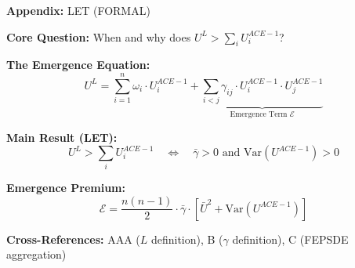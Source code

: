 
\begin{tcolorbox}[colback=blue!5!white, colframe=blue!75!black,
    title=Quick Reference: Level Emergence Theorem]
\textbf{Appendix:} LET (FORMAL)


\textbf{Core Question:} When and why does $U^L > \sum_i U^{ACE-1}_i$?

\textbf{The Emergence Equation:}
\begin{equation}
U^L = \sum_{i=1}^{n} \omega_i \cdot U^{ACE-1}_i + \underbrace{\sum_{i<j} \gamma_{ij} \cdot U^{ACE-1}_i \cdot U^{ACE-1}_j}_{\text{Emergence Term } \mathcal{E}}
\label{eq:let-aggregation}
\end{equation}

\textbf{Main Result (LET):}
\begin{equation}
\boxed{U^L > \sum_i U^{ACE-1}_i \quad \Longleftrightarrow \quad \bar{\gamma} > 0 \text{ and } \text{Var}(U^{ACE-1}) > 0}
\end{equation}

\textbf{Emergence Premium:}
\begin{equation}
\mathcal{E} = \frac{n(n-1)}{2} \cdot \bar{\gamma} \cdot \left[ \bar{U}^2 + \text{Var}(U^{ACE-1}) \right]
\end{equation}

\textbf{Cross-References:} AAA ($L$ definition), B ($\gamma$ definition), C (FEPSDE aggregation)
\end{tcolorbox}


